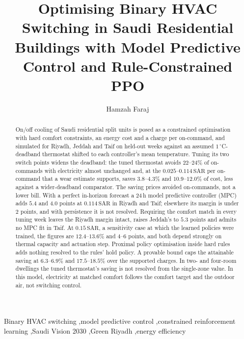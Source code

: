 \documentclass[3p,twocolumn,number]{elsarticle}
\newcommand{\SAR}{\text{SAR}}
\begin{document}
 
\begin{frontmatter}
 
\title{Optimising Binary HVAC Switching in Saudi Residential Buildings with Model
Predictive Control and Rule-Constrained PPO}

\author[tu]{Hamzah Faraj}

 
\begin{abstract}
On/off cooling of Saudi residential split units is posed as a constrained optimisation with hard comfort constraints, an energy cost and a charge per on-command, and simulated for Riyadh, Jeddah and Taif on held-out weeks against an assumed $1\,^\circ$C-deadband thermostat shifted to each controller's mean temperature. Tuning its two switch points widens the deadband: the tuned thermostat avoids $22$--$24\%$ of on-commands with electricity almost unchanged and, at the $0.025$--$0.114\,\SAR$ per on-command that a wear estimate supports, saves $3.8$--$4.3\%$ and $10.9$--$12.0\%$ of cost, less against a wider-deadband comparator. The saving prices avoided on-commands, not a lower bill. With a perfect in-horizon forecast a $24\,$h model predictive controller (MPC) adds $5.4$ and $4.0$ points at $0.114\,\SAR$ in Riyadh and Taif; elsewhere its margin is under $2$ points, and with persistence it is not resolved. Requiring the comfort match in every tuning week leaves the Riyadh margin intact, raises Jeddah's to $5.3$ points and admits no MPC fit in Taif. At $0.15\,\SAR$, a sensitivity case at which the learned policies were trained, the figures are $12.4$--$13.6\%$ and $4$--$6$ points, and both depend strongly on thermal capacity and actuation step. Proximal policy optimisation inside hard rules adds nothing resolved to the rules' hold policy. A provable bound caps the attainable saving at $6.3$--$6.9\%$ and $17.5$--$18.5\%$ over the supported charges. In two- and four-room dwellings the tuned thermostat's saving is not resolved from the single-zone value. In this model, electricity at matched comfort follows the comfort target and the outdoor air, not switching control.
\end{abstract}
 
\begin{keyword}
Binary HVAC switching \sep model predictive control \sep constrained reinforcement learning \sep Saudi Vision 2030 \sep Green Riyadh \sep energy efficiency
\end{keyword}
 
\end{frontmatter}
 
\end{document}
